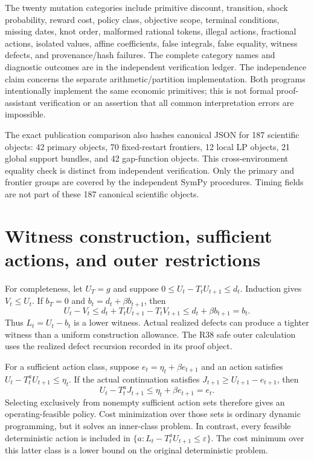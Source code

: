 The twenty mutation categories include primitive discount, transition, shock probability, reward cost, policy class, objective scope, terminal conditions, missing dates, knot order, malformed rational tokens, illegal actions, fractional actions, isolated values, affine coefficients, false integrals, false equality, witness defects, and provenance/hash failures. The complete category names and diagnostic outcomes are in the independent verification ledger. The independence claim concerns the separate arithmetic/partition implementation. Both programs intentionally implement the same economic primitives; this is not formal proof-assistant verification or an assertion that all common interpretation errors are impossible.

The exact publication comparison also hashes canonical JSON for 187 scientific objects: 42 primary objects, 70 fixed-restart frontiers, 12 local LP objects, 21 global support bundles, and 42 gap-function objects. This cross-environment equality check is distinct from independent verification. Only the primary and frontier groups are covered by the independent SymPy procedures. Timing fields are not part of these 187 canonical scientific objects.

\section{Witness construction, sufficient actions, and outer restrictions}
For completeness, let $U_T=g$ and suppose $0\leq U_t-T_tU_{t+1}\leq d_t$. Induction gives $V_t\leq U_t$. If $b_T=0$ and $b_t=d_t+\beta b_{t+1}$, then
\[
 U_t-V_t\leq d_t+T_tU_{t+1}-T_tV_{t+1}\leq d_t+\beta b_{t+1}=b_t.
\]
Thus $L_t=U_t-b_t$ is a lower witness. Actual realized defects can produce a tighter witness than a uniform construction allowance. The R38 safe outer calculation uses the realized defect recursion recorded in its proof object.

For a sufficient action class, suppose $e_t=\eta_t+\beta e_{t+1}$ and an action satisfies $U_t-T_t^aU_{t+1}\leq\eta_t$. If the actual continuation satisfies $J_{t+1}\geq U_{t+1}-e_{t+1}$, then
\[
 U_t-T_t^aJ_{t+1}\leq\eta_t+\beta e_{t+1}=e_t.
\]
Selecting exclusively from nonempty sufficient action sets therefore gives an operating-feasible policy. Cost minimization over those sets is ordinary dynamic programming, but it solves an inner-class problem. In contrast, every feasible deterministic action is included in $\{a:L_t-T_t^aU_{t+1}\leq\varepsilon\}$. The cost minimum over this latter class is a lower bound on the original deterministic problem.

